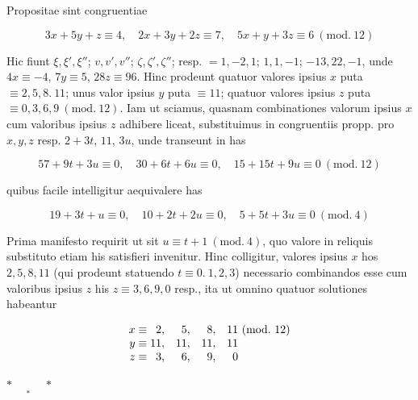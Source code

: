 Propositae sint congruentiae

\[3x+5y+z\equiv4,\quad2x+3y+2z\equiv7,\quad5x+y+3z\equiv6\ (\mathrm{mod.}\ 12)\]

 Hic fiunt $\xi,\xi',\xi''$; $v,v',v''$; $\zeta,\zeta',\zeta''$; resp. $=1,-2,1$; $1,1,-1$; $-13,22,-1$, unde $4x\equiv-4$, $7y\equiv5$, $28z\equiv96$. Hinc prodeunt quatuor valores ipsius $x$ puta $\equiv2,5,8.\ 11$; unus valor ipsius $y$ puta $\equiv11$; quatuor valores ipsius $z$ puta $\equiv0,3,6,9\ (\mathrm{mod.}\ 12)$. Iam ut sciamus, quasnam combinationes valorum ipsius $x$ cum valoribus ipsius $z$ adhibere liceat, substituimus in congruentiis propp. pro $x,y,z$ resp. $2+3t$, $11$, $3u$, unde transeunt in has

\[57+9t+3u\equiv0,\quad30+6t+6u\equiv0,\quad15+15t+9u\equiv0\ (\mathrm{mod.}\ 12)\]

 quibus facile intelligitur aequivalere has

\[19+3t+u\equiv0,\quad10+2t+2u\equiv0,\quad5+5t+3u\equiv0\ (\mathrm{mod.}\ 4)\]

 Prima manifesto requirit ut sit $u\equiv t+1\ (\mathrm{mod.}\ 4)$, quo valore in reliquis substituto etiam his satisfieri invenitur. Hinc colligitur, valores ipsius $x$ hos $2,5,8,11$ (qui prodeunt statuendo $t\equiv0.\ 1,2,3$) necessario combinandos esse cum valoribus ipsius $z$ his $z\equiv3,6,9,0$ resp., ita ut omnino quatuor solutiones habeantur

\[\begin{array}{r@{\;}r@{,\quad}r@{,\quad}r@{,\quad}r@{\ }l}
x\equiv&2&5&8&11&(\mathrm{mod.}\ 12)\\
y\equiv&11&11&11&11&\\
z\equiv&3&6&9&0&
\end{array}\]

\begin{center}$\ast\quad\underset{\ast}{\phantom{\ast}}\quad\ast$\end{center}
